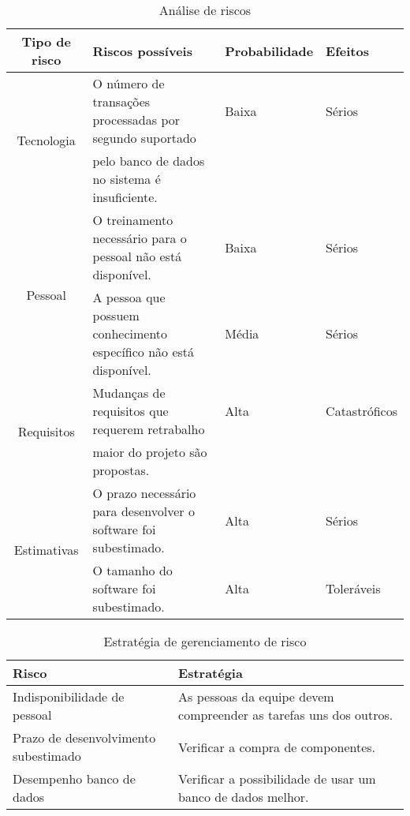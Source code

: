\documentclass[letter]{article}
\begin{document}
\begin{table}[h!]
\begin{tabular}{clll}
\hline 
Tipo de risco & Riscos possíveis & Probabilidade & Efeitos\tabularnewline
\hline
\hline 
\multirow{2}{*}{Tecnologia}
 & O número de transações processadas por segundo suportado & Baixa & Sérios\tabularnewline
 & pelo banco de dados no sistema é insuficiente. &  & \tabularnewline
\multirow{2}{*}{Pessoal} & O treinamento necessário para o pessoal não está disponível. & Baixa & Sérios\tabularnewline
 & A pessoa que possuem conhecimento específico não está disponível. & Média & Sérios\tabularnewline
\multirow{2}{*}{Requisitos} & Mudanças de requisitos que requerem retrabalho & Alta & Catastróficos\tabularnewline
 &  maior do projeto são propostas. &  & \tabularnewline
\multirow{2}{*}{Estimativas} & O prazo necessário para desenvolver o software foi subestimado. & Alta & Sérios\tabularnewline
 & O tamanho do software foi subestimado. & Alta & Toleráveis\tabularnewline
\hline
\end{tabular}

\caption{Análise de riscos}
\label{r1}
\end{table}
%
\begin{table}[h!]
\begin{tabular}{ll}
\hline 
Risco & Estratégia\tabularnewline
\hline
\hline 
Indisponibilidade de pessoal & As pessoas da equipe devem compreender as tarefas uns dos outros.\tabularnewline
Prazo de desenvolvimento subestimado & Verificar a compra de componentes.\tabularnewline
Desempenho banco de dados & Verificar a possibilidade de usar um banco de dados melhor.\tabularnewline
\hline
\end{tabular}

\caption{Estratégia de gerenciamento de risco}
\label{r2}

\end{table}
\end{document}

